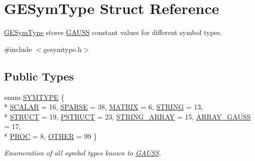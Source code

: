 \hypertarget{struct_g_e_sym_type}{\section{G\-E\-Sym\-Type Struct Reference}
\label{struct_g_e_sym_type}
}


\hyperlink{struct_g_e_sym_type}{G\-E\-Sym\-Type} stores \hyperlink{class_g_a_u_s_s}{G\-A\-U\-S\-S} constant values for different symbol types.  




{\ttfamily \#include $<$gesymtype.\-h$>$}

\subsection*{Public Types}
\begin{DoxyCompactItemize}
\item 
enum \hyperlink{struct_g_e_sym_type_a05477e08255bea70296f7825493e95fc}{S\-Y\-M\-T\-Y\-P\-E} \{ \\*
\hyperlink{struct_g_e_sym_type_a05477e08255bea70296f7825493e95fca0e3633d8cf7dbbdbe3b45bdd24cae7b0}{S\-C\-A\-L\-A\-R} = 16, 
\hyperlink{struct_g_e_sym_type_a05477e08255bea70296f7825493e95fcaaf5984cc491fc4b4fcf2162f18f0272c}{S\-P\-A\-R\-S\-E} = 38, 
\hyperlink{struct_g_e_sym_type_a05477e08255bea70296f7825493e95fcace35d10ede406b8a2768ddac17b1d22c}{M\-A\-T\-R\-I\-X} = 6, 
\hyperlink{struct_g_e_sym_type_a05477e08255bea70296f7825493e95fcad7b91a02b7bd02be62866581fb00ab77}{S\-T\-R\-I\-N\-G} = 13, 
\\*
\hyperlink{struct_g_e_sym_type_a05477e08255bea70296f7825493e95fcad16784afa03e303f68740a9a33dc887b}{S\-T\-R\-U\-C\-T} = 19, 
\hyperlink{struct_g_e_sym_type_a05477e08255bea70296f7825493e95fcab84d43f39e58b9cd3995b3aafc7239d6}{P\-S\-T\-R\-U\-C\-T} = 23, 
\hyperlink{struct_g_e_sym_type_a05477e08255bea70296f7825493e95fcadba1b6c2cd5c27167323652b1c23c9e0}{S\-T\-R\-I\-N\-G\-\_\-\-A\-R\-R\-A\-Y} = 15, 
\hyperlink{struct_g_e_sym_type_a05477e08255bea70296f7825493e95fcad3f85fecfcee857d9b08cf4ebe77c32f}{A\-R\-R\-A\-Y\-\_\-\-G\-A\-U\-S\-S} = 17, 
\\*
\hyperlink{struct_g_e_sym_type_a05477e08255bea70296f7825493e95fca4793088111ff7058b2bd6e4bde07f816}{P\-R\-O\-C} = 8, 
\hyperlink{struct_g_e_sym_type_a05477e08255bea70296f7825493e95fca7d507081df635250120e56c8766ec504}{O\-T\-H\-E\-R} = 99
 \}
\begin{DoxyCompactList}\small\item\em Enumeration of all symbol types known to \hyperlink{class_g_a_u_s_s}{G\-A\-U\-S\-S}. \end{DoxyCompactList}\end{DoxyCompactItemize}


